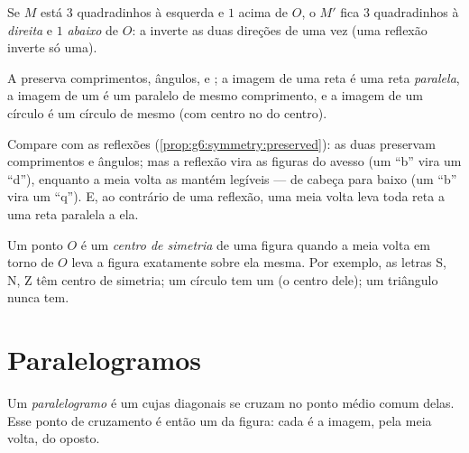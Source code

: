 \begin{example}\label{ex:g7:central:grid}
Se $M$ está $3$ quadradinhos à esquerda e $1$ acima de $O$, o 
$M'$ fica $3$ quadradinhos à \emph{direita} e $1$ \emph{abaixo} de $O$:
a  inverte as duas direções de uma vez (uma reflexão
inverte só uma).
\end{example}

\begin{proposition}\label{prop:g7:central:preserved}
A  preserva comprimentos, ângulos,  e ;
a imagem de uma reta é uma reta \emph{paralela}, a imagem de um
 é um  paralelo de mesmo comprimento, e a imagem de um
círculo é um círculo de mesmo  (com centro no  do
centro).
\end{proposition}
\admitted

\begin{remark}
Compare com as reflexões (\cref{prop:g6:symmetry:preserved}): as duas
preservam comprimentos e ângulos; mas a reflexão vira as figuras do
avesso (um ``b'' vira um ``d''), enquanto a meia volta as mantém
legíveis --- de cabeça para baixo (um ``b'' vira um ``q''). E, ao
contrário de uma reflexão, uma meia volta leva toda reta a uma reta
paralela a ela.
\end{remark}

\begin{definition}\label{def:g7:central:center}
Um ponto $O$ é um \emph{centro de simetria}
de uma figura quando a meia volta em torno de $O$ leva a figura
exatamente sobre ela mesma. Por exemplo, as letras S, N, Z têm centro
de simetria; um círculo tem um (o centro dele); um triângulo nunca
tem.
\end{definition}

\section{Paralelogramos}

\begin{definition}[Paralelogramo]\label{def:g7:central:parallelogram}
Um \emph{paralelogramo} é um  cujas
diagonais se cruzam no ponto médio comum delas. Esse ponto de
cruzamento é então um  da figura: cada  é a
imagem, pela meia volta, do  oposto.
\end{definition}

